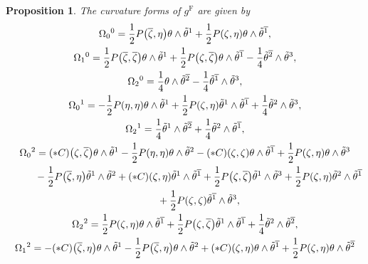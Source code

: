 \documentclass[11pt]{article}
\numberwithin{equation}{section}
\newcommand\ol{\overline}
\numberwithin{equation}{section}
\newtheorem{Proposition}[Theorem]{Proposition}
 { \theoremstyle{definition}
\newtheorem{Definition}[Theorem]{Definition}
\newtheorem*{Notation}{Notation}
\newtheorem{Example}[Theorem]{Example}
\newtheorem{Remark}[Theorem]{Remark} }
\begin{document}
\begin{Proposition}
The curvature forms of $g^{\mathrm{F}}$ are given by
\begin{gather*}
\Omega_0{}^0=\frac{1}{2}P\bigl(\ol\zeta, \eta\bigr)\theta\wedge\tilde\theta^{1}+\frac{1}{2}P(\zeta, \eta)\theta\wedge\tilde\theta^{\ol1}, \\
\Omega_1{}^0=\frac{1}{2}P\bigl(\ol\zeta, \ol\zeta\bigr)\theta\wedge\tilde\theta^1
 +\frac{1}{2}P\bigl(\zeta, \ol\zeta\bigr)\theta\wedge\tilde\theta^{\ol1}-\frac{1}{4}\tilde\theta^{\ol2}\wedge\tilde\theta^3, \\
 \Omega_2{}^0=\frac{1}{4}\theta\wedge\tilde\theta^{\ol2}-\frac{1}{4}\tilde\theta^{\ol1}\wedge\tilde\theta^3, \\
\Omega_0{}^1=-\frac{1}{2}P(\eta, \eta)\theta\wedge\tilde\theta^1+\frac{1}{2}P(\zeta, \eta)\tilde\theta^1\wedge\tilde\theta^{\ol1}+\frac{1}{4}\tilde\theta^2\wedge\tilde\theta^3, \\
\Omega_2{}^1=\frac{1}{4}\tilde\theta^1\wedge\tilde\theta^{\ol2}+\frac{1}{4}\tilde\theta^2\wedge\tilde\theta^{\ol1}, \\
\Omega_0{}^2=(*C)\bigl(\zeta, \ol\zeta\bigr)\theta\wedge\tilde\theta^1-\frac{1}{2}P(\eta, \eta)\theta\wedge\tilde\theta^2
 -(*C)(\zeta, \zeta)\theta\wedge\tilde\theta^{\ol1}+\frac{1}{2}P(\zeta, \eta)\theta\wedge\tilde\theta^3 \\
\hphantom{\Omega_0{}^2=}{}\hspace{0.2mm}
 -\frac{1}{2}P\bigl(\ol\zeta, \eta\bigr)\tilde\theta^1\wedge\tilde\theta^2
+(*C)(\zeta, \eta)\tilde\theta^1\wedge\tilde\theta^{\ol1}
+\frac{1}{2}P\bigl(\zeta, \ol\zeta\bigr) \tilde\theta^1\wedge\tilde\theta^3
+\frac{1}{2}P(\zeta, \eta)\tilde\theta^2\wedge\tilde\theta^{\ol1}
 \\
\hphantom{\Omega_0{}^2=}{}\hspace{0.2mm}
 +\frac{1}{2}P(\zeta, \zeta)\tilde\theta^{\ol1}\wedge\tilde\theta^3, \\
\Omega_2{}^2=\frac{1}{2}P(\zeta, \eta)\theta\wedge\tilde\theta^{\ol1}+\frac{1}{2}P\bigl(\zeta, \ol\zeta\bigr)\tilde\theta^1\wedge\tilde\theta^{\ol1}+\frac{1}{4}\tilde\theta^2\wedge\tilde\theta^{\ol2}, \\
\Omega_1{}^2=-(*C)\bigl(\ol\zeta, \eta\bigr)\theta\wedge\tilde\theta^1 -\frac{1}{2}P\bigl(\ol\zeta, \eta\bigr)\theta\wedge\tilde\theta^2
+(*C)(\zeta, \eta)\theta\wedge\tilde\theta^{\ol1}
+\frac{1}{2}P(\zeta, \eta)\theta\wedge\tilde\theta^{\ol2}
 \\
\hphantom{\Omega_1{}^2=}{}\hspace{0.2mm}

\end{gather*}
\end{Proposition}
\end{document}

